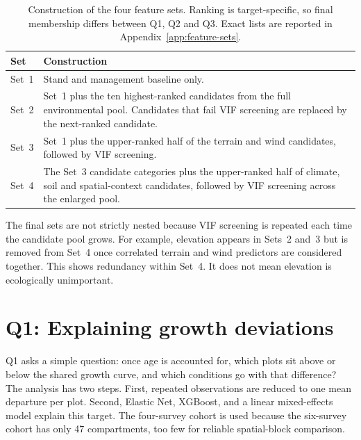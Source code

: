 \begin{table}[!htbp]
\centering
\scriptsize
\renewcommand{\arraystretch}{1.15}
\begin{tabularx}{\linewidth}{@{}p{1.4cm}X@{}}
\toprule
Set & Construction \\
\midrule

Set~1
& Stand and management baseline only. \\

Set~2
& Set~1 plus the ten highest-ranked candidates from the full environmental pool. Candidates that fail VIF screening are replaced by the next-ranked candidate. \\

Set~3
& Set~1 plus the upper-ranked half of the terrain and wind candidates, followed by VIF screening. \\

Set~4
& The Set~3 candidate categories plus the upper-ranked half of climate, soil and spatial-context candidates, followed by VIF screening across the enlarged pool. \\

\bottomrule
\end{tabularx}
\caption{Construction of the four feature sets. Ranking is target-specific, so final membership differs between Q1, Q2 and Q3. Exact lists are reported in Appendix~\ref{app:feature-sets}.}
\label{tab:feature-sets-construction}
\end{table}

The final sets are not strictly nested because VIF screening is repeated each time the candidate pool grows. For example, elevation appears in Sets~2 and~3 but is removed from Set~4 once correlated terrain and wind predictors are considered together. This shows redundancy within Set~4. It does not mean elevation is ecologically unimportant.

\section{Q1: Explaining growth deviations}
Q1 asks a simple question: once age is accounted for, which plots sit above or below the shared growth curve, and which conditions go with that difference? The analysis has two steps. First, repeated observations are reduced to one mean departure per plot. Second, Elastic Net, XGBoost, and a linear mixed-effects model explain this target. The four-survey cohort is used because the six-survey cohort has only 47 compartments, too few for reliable spatial-block comparison.

